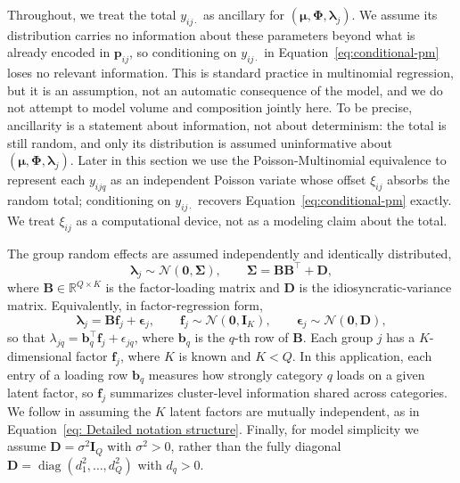 Throughout, we treat the total $y_{ij\cdot}$ as ancillary for $(\bm\mu,\bm\Phi,\bm\lambda_j)$. We assume its distribution carries no information about these parameters beyond what is already encoded in $\bm{p}_{ij}$, so conditioning on $y_{ij\cdot}$ in Equation~\eqref{eq:conditional-pm} loses no relevant information. This is standard practice in multinomial regression, but it is an assumption, not an automatic consequence of the model, and we do not attempt to model volume and composition jointly here. To be precise, ancillarity is a statement about information, not about determinism: the total is still random, and only its distribution is assumed uninformative about $(\bm\mu,\bm\Phi,\bm\lambda_j)$. Later in this section we use the Poisson-Multinomial equivalence to represent each $y_{ijq}$ as an independent Poisson variate whose offset $\xi_{ij}$ absorbs the random total; conditioning on $y_{ij\cdot}$ recovers Equation~\eqref{eq:conditional-pm} exactly. We treat $\xi_{ij}$ as a computational device, not as a modeling claim about the total.

The group random effects are assumed independently and identically distributed,
\begin{equation}
\bm\lambda_j\sim\mathcal{N}(\bm0,\bm\Sigma),\qquad\bm\Sigma=\mathbf{B}\mathbf{B}^\top+\mathbf{D},
\label{eq: Overall notation structure}
\end{equation}
where $\mathbf{B}\in\mathbb{R}^{Q\times K}$ is the factor-loading matrix and $\mathbf{D}$ is the idiosyncratic-variance matrix. Equivalently, in factor-regression form,
\begin{equation}
\bm\lambda_j=\mathbf{B}\mathbf{f}_j+\bm\epsilon_j,\qquad\mathbf{f}_j\sim\mathcal{N}(\bm0,\mathbf{I}_K),\qquad\bm\epsilon_j\sim\mathcal{N}(\bm0,\mathbf{D}),
\label{eq: Detailed notation structure}
\end{equation}
so that $\lambda_{jq}=\mathbf{b}_q^\top\mathbf{f}_j+\epsilon_{jq}$, where $\mathbf{b}_q$ is the $q$-th row of $\mathbf{B}$. Each group $j$ has a $K$-dimensional factor $\mathbf{f}_j$, where $K$ is known and $K<Q$. In this application, each entry of a loading row $\mathbf{b}_q$ measures how strongly category $q$ loads on a given latent factor, so $\mathbf{f}_j$ summarizes cluster-level information shared across categories. We follow \citet{Cui2026} in assuming the $K$ latent factors are mutually independent, as in Equation~\eqref{eq: Detailed notation structure}. Finally, for model simplicity we assume $\mathbf{D}=\sigma^2\mathbf{I}_Q$ with $\sigma^2>0$, rather than the fully diagonal $\mathbf{D}=\operatorname{diag}(d_1^2,\dots,d_Q^2)$ with $d_q>0$.

